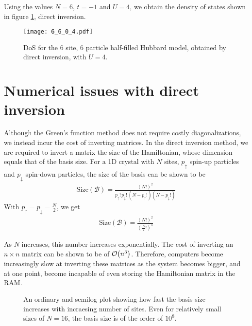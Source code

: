 		Using the values $ N = 6 $, $ t = -1 $ and $ U = 4 $, we obtain the density of states shown in figure \ref{fig:6_6_0_4}, direct inversion.
		\begin{figure}[h!]
			\centering
			\texttt{[image: 6\_6\_0\_4.pdf]}
			\caption{DoS for the 6 site, 6 particle half-filled Hubbard model, obtained by direct inversion, with $ U=4 $.}
			\label{fig:6_6_0_4}
		\end{figure}

\section{Numerical issues with direct inversion}
	Although the Green's function method does not require costly diagonalizations, we instead incur the cost of inverting matrices. In the direct inversion method, we are required to invert a matrix the size of the Hamiltonian, whose dimension equals that of the basis size. For a 1D crystal with $ N $ sites, $ p_{\uparrow} $ spin-up particles and $ p_{\downarrow} $ spin-down particles, the size of the basis can be shown to be
	\begin{align}
		\mathrm{Size}\left( \mathcal{B} \right) =
		\frac{\left( N! \right)^{2} }{p_{\uparrow}!\,p_{\downarrow}!\,\left( N-p_{\uparrow}!\right) \left( N-p_{\downarrow}!\right) }
	\end{align}
	With $ p_{\uparrow} = p_{\downarrow} = \tfrac{N}{2} $, we get
	\begin{align}
		\mathrm{Size}\left( \mathcal{B} \right) =
		\frac{\left( N! \right)^{2} }{\left( \tfrac{N}{2}! \right)^{4}}
	\end{align}
	
	As $ N $ increases, this number increases exponentially. The cost of inverting an $ n \times n $ matrix can be shown to be of $ \order{n^3} $. Therefore, computers become increasingly slow at inverting these matrices as the system becomes bigger, and at one point, become incapable of even storing the Hamiltonian matrix in the RAM.
	
	\begin{figure}[h!]
		\centering
		\caption{An ordinary and semilog plot showing how fast the basis size increases with incraesing number of sites. Even for relatively small sizes of $ N = 16 $, the basis size is of the order of $ 10^{8} $.}
	\end{figure}
	
	

	
	
	



